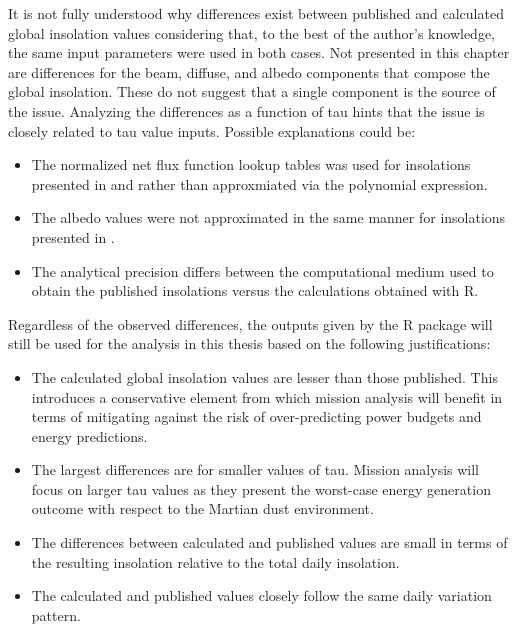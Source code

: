 It is not fully understood why differences exist between published and calculated global insolation values considering that, to the best of the author's knowledge, the same input parameters were used in both cases. Not presented in this chapter are differences for the beam, diffuse, and albedo components that compose the global insolation. These do not suggest that a single component is the source of the issue. Analyzing the differences as a function of tau hints that the issue is closely related to tau value inputs. Possible explanations could be:
\begin{itemize}
    \item The normalized net flux function lookup tables was used for insolations presented in  and  rather than approxmiated via the polynomial expression.
    \item The albedo values were not approximated in the same manner for insolations presented in .
    \item The analytical precision differs between the computational medium used to obtain the published insolations versus the calculations obtained with R.
\end{itemize}

Regardless of the observed differences, the outputs given by the R package will still be used for the analysis in this thesis based on the following justifications:
\begin{itemize}
  \item The calculated global insolation values are lesser than those published. This introduces a conservative element from which mission analysis will benefit in terms of mitigating against the risk of over-predicting power budgets and energy predictions.
  \item The largest differences are for smaller values of tau. Mission analysis will focus on larger tau values as they present the worst-case energy generation outcome with respect to the Martian dust environment.
  \item The differences between calculated and published values are small in terms of the resulting insolation relative to the total daily insolation.
  \item The calculated and published values closely follow the same daily variation pattern.
\end{itemize}
